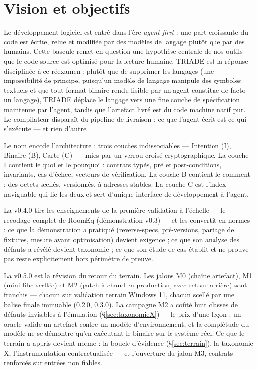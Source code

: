\section{Vision et objectifs}\label{sec:vision}

Le développement logiciel est entré dans l’ère \emph{agent-first} : une part croissante du
code est écrite, relue et modifiée par des modèles de langage plutôt que par des humains.
Cette bascule remet en question une hypothèse centrale de nos outils — que le code source
est optimisé pour la lecture humaine. TRIADE est la réponse disciplinée à ce réexamen :
plutôt que de supprimer les langages (une impossibilité de principe, puisqu’un modèle de
langage manipule des symboles textuels et que tout format binaire rendu lisible par un
agent constitue de facto un langage), TRIADE déplace le langage vers une fine couche de
spécification maintenue par l’agent, tandis que l’artefact livré est du code machine natif
pur. Le compilateur disparaît du pipeline de livraison : ce que l’agent écrit est ce qui
s’exécute — et rien d’autre.

Le nom encode l’architecture : trois couches indissociables — Intention (I), Binaire (B),
Carte (C) — unies par un verrou croisé cryptographique. La couche I contient le quoi et le
pourquoi : contrats typés, pré et post-conditions, invariants, cas d’échec, vecteurs de
vérification. La couche B contient le comment : des octets scellés, versionnés, à adresses
stables. La couche C est l’index naviguable qui lie les deux et sert d’unique interface de
développement à l’agent.

La v0.4.0 tire les enseignements de la première validation à l’échelle — le recodage
complet de RoomEq (démonstration v0.3) — et les convertit en normes : ce que la
démonstration a pratiqué (reverse-specs, pré-versions, partage de fixtures, mesure avant
optimisation) devient exigence ; ce que son analyse des défauts a révélé devient
taxonomie ; ce que son étude de cas établit et ne prouve pas reste explicitement hors
périmètre de preuve.

La v0.5.0 est la révision du retour du terrain. Les jalons M0 (chaîne artefact), M1
(mini-libc scellée) et M2 (patch à chaud en production, avec retour arrière) sont
franchis — chacun sur validation terrain Windows 11, chacun scellé par une balise
finale immuable (0.2.0, 0.3.0). La campagne M2 a coûté huit classes de défauts
invisibles à l’émulation (§\ref{sec:taxonomieX}) — le prix d’une leçon : un oracle
valide un artefact contre un modèle d’environnement, et la complétude du modèle ne se
démontre qu’en exécutant le binaire sur le système réel. Ce que le terrain a appris
devient norme : la boucle d’évidence (§\ref{sec:terrain}), la taxonomie X,
l’instrumentation contractualisée — et l’ouverture du jalon M3, contrats renforcés
sur entrées non fiables.

